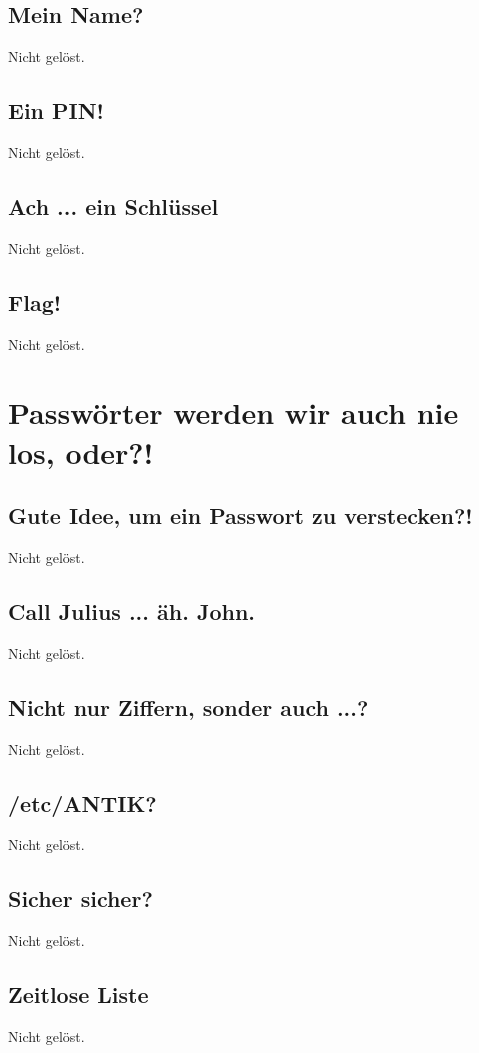 \documentclass[12pt,a4paper,titlepage,oneside]{scrartcl}
\begin{document}
\subsection{Mein Name?}
Nicht gelöst.

\subsection{Ein PIN!}
Nicht gelöst.

\subsection{Ach ... ein Schl\"ussel}
Nicht gelöst.

\subsection{Flag!}
Nicht gelöst.


\section{Passwörter werden wir auch nie los, oder?!}

\subsection{Gute Idee, um ein Passwort zu verstecken?!}
Nicht gelöst.

\subsection{Call Julius ... äh. John.}
Nicht gelöst.

\subsection{Nicht nur Ziffern, sonder auch ...?}
Nicht gelöst.

\subsection{/etc/ANTIK?}
Nicht gelöst.

\subsection{Sicher sicher?}
Nicht gelöst.

\subsection{Zeitlose Liste}
Nicht gelöst.
\end{document}
